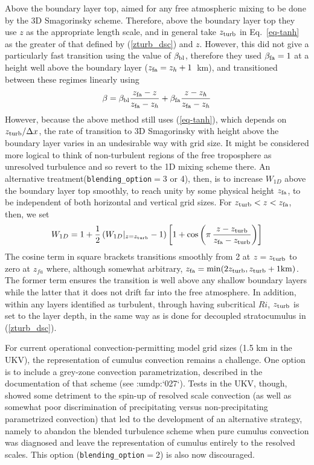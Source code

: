 \documentclass{UMDP_article}
\newcommand{\citeumdp}[1]{:umdp:`#1`}
\begin{document}
Above the boundary layer top, \cite{Boutleetal2014} aimed for any free 
atmospheric mixing to be done by the 3D Smagorinsky scheme. Therefore, above
the boundary layer top they use $z$ as the appropriate length scale, and in 
general take $z_{\rm turb}$ in Eq.~\ref{eq-tanh} as the greater of that defined 
by (\ref{zturb_dsc}) and $z$. However, this did not give a particularly 
fast transition using the value of $\beta_{\rm  bl}$, therefore they used 
$\beta_{\rm fa}=1$ at a height well above the boundary layer 
($z_{\rm fa}=z_h+1$~km), and transitioned between these regimes linearly using
\begin{equation}
  \beta = \beta_{\rm bl}\frac{z_{\rm fa}-z}{z_{\rm fa}-z_h} + 
          \beta_{\rm fa}\frac{z-z_h}{z_{\rm fa}-z_h}
\end{equation}
However, because the above method still uses (\ref{eq-tanh}), which depends on 
$z_{\rm turb}/\Delta x$, the rate of transition to 3D Smagorinsky with height 
above the boundary layer varies in an undesirable way with grid size.  It 
might be considered more logical to think of non-turbulent regions of the free 
troposphere as unresolved turbulence and so revert to the 1D mixing scheme 
there.  An alternative treatment({\tt blending\_option}$=$3 or 4), then, is to 
increase $W_{1D}$ above the boundary layer top smoothly, to reach unity by 
some physical height $z_{\rm fa}$, to be independent of both horizontal and 
vertical grid sizes.  For $z_{\rm turb} < z < z_{\rm fa}$, then, we set
\begin{equation}
  W_{1D} = 1 + \frac{1}{2} \left( W_{1D}|_{z=z_{\rm turb}} - 1 \right)
    \left[ 1 + {\rm cos}\left( \pi \, \frac{z-z_{\rm turb}}{z_{\rm fa}-z_{\rm turb}}
                     \right) \right]
\end{equation}
The cosine term in square brackets transitions smoothly from 2 at 
$z=z_{\rm turb}$ to zero at $z_{fa}$ where, although somewhat 
arbitrary, $z_{\rm fa} = {\rm min}(2 z_{\rm turb}, z_{\rm turb}+1 {\rm km})$.  
The former term ensures the transition is well above any shallow boundary 
layers while the latter that it does not drift far into the free atmosphere.  
In addition, within any layers identified as turbulent, through having 
subcritical $Ri$, $z_{\rm turb}$ is set to the layer depth, in the same way 
as is done for decoupled stratocumulus in (\ref{zturb_dsc}).

For current operational convection-permitting model grid sizes (1.5 km
in the UKV), the representation of cumulus convection remains a
challenge.  One option is to include a grey-zone convection
parametrization, described in the documentation of that scheme 
(see \citeumdp{027}).  Tests in the UKV, though, showed some
detriment to the spin-up of resolved scale convection (as well as
somewhat poor discrimination of precipitating versus non-precipitating
parametrized convection) that led to the development of an alternative
strategy, namely to abandon the blended turbulence scheme when pure
cumulus convection was diagnosed and leave the representation of
cumulus entirely to the resolved scales.  This option 
({\tt blending\_option}$=$2) is also now discouraged.
\end{document}
